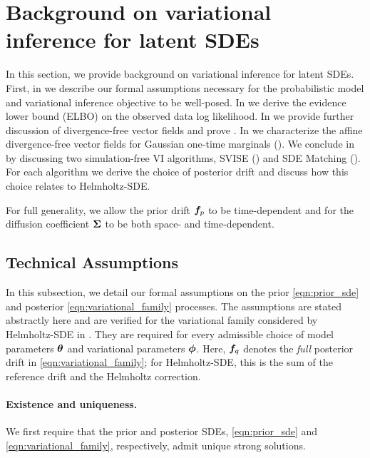 \section{Background on variational inference for latent SDEs}\label{app:sec:background}

In this section, we provide background on variational inference for latent SDEs. 
First, in  we describe our formal assumptions necessary for the probabilistic model and variational inference objective to be well-posed.   
In  we derive the evidence lower bound (ELBO) on the observed data log likelihood.
In  we provide further discussion of divergence-free vector fields and prove .
In  we characterize the affine divergence-free vector fields for Gaussian one-time marginals ().
We conclude in  by discussing two simulation-free VI algorithms, SVISE (\citet{course2023state, course2023amortized}) and SDE Matching (\citet{bartosh2025sde}). For each algorithm we derive the choice of posterior drift and discuss how this choice relates to Helmholtz-SDE.

For full generality, we allow the prior drift $\boldsymbol{f}_p$ to be time-dependent and for the diffusion coefficient $\boldsymbol{\Sigma}$ to be both space- and time-dependent.

\subsection{Technical Assumptions}\label{app:subsec:assumptions}
 
In this subsection, we detail our formal assumptions on the prior \eqref{eqn:prior_sde} and posterior \eqref{eqn:variational_family} processes. 
The assumptions are stated abstractly here and are verified for the variational family considered by Helmholtz-SDE in .
They are required for every admissible choice of model parameters $\boldsymbol{\theta}$ and variational parameters $\boldsymbol{\phi}$.  
Here, $\boldsymbol{f}_q$ denotes the \emph{full} posterior drift in \cref{eqn:variational_family}; for Helmholtz-SDE, this is the sum of the reference drift and the Helmholtz correction.

\paragraph{Existence and uniqueness.}
We first require that the prior and posterior SDEs, \cref{eqn:prior_sde} and \cref{eqn:variational_family}, respectively, admit unique strong solutions.
 
